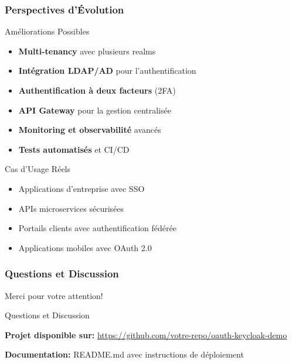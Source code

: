 \documentclass[aspectratio=169]{beamer}
\begin{document}
\begin{frame}
    \frametitle{Perspectives d'Évolution}
    \begin{block}{Améliorations Possibles}
        \begin{itemize}
            \item \textbf{Multi-tenancy} avec plusieurs realms
            \item \textbf{Intégration LDAP/AD} pour l'authentification
            \item \textbf{Authentification à deux facteurs} (2FA)
            \item \textbf{API Gateway} pour la gestion centralisée
            \item \textbf{Monitoring et observabilité} avancés
            \item \textbf{Tests automatisés} et CI/CD
        \end{itemize}
    \end{block}
    
    \begin{block}{Cas d'Usage Réels}
        \begin{itemize}
            \item Applications d'entreprise avec SSO
            \item APIs microservices sécurisées
            \item Portails clients avec authentification fédérée
            \item Applications mobiles avec OAuth 2.0
        \end{itemize}
    \end{block}
\end{frame}

\begin{frame}
    \frametitle{Questions et Discussion}
    \begin{center}
        \Huge Merci pour votre attention!
        
        \vspace{1cm}
        
        \Large Questions et Discussion
        
        \vspace{1cm}
        
        \normalsize
        \textbf{Projet disponible sur:} \url{https://github.com/votre-repo/oauth-keycloak-demo}
        
        \textbf{Documentation:} README.md avec instructions de déploiement
    \end{center}
\end{frame}
\end{document}
